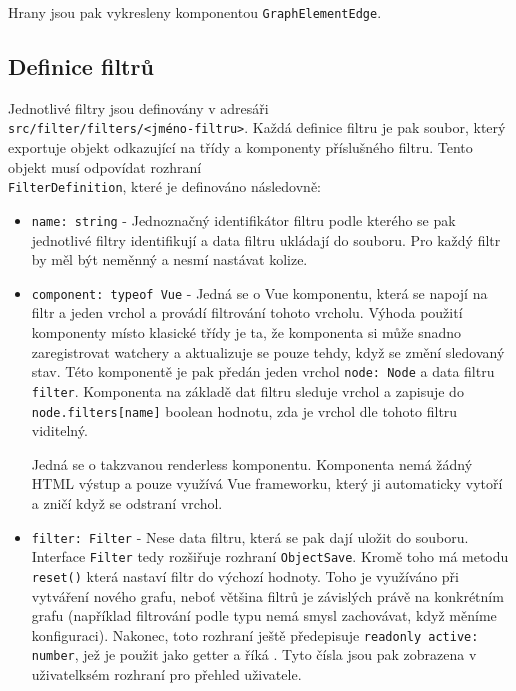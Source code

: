 \bigskip

Hrany jsou pak vykresleny komponentou \texttt{GraphElementEdge}.




\subsection{Definice filtrů}
Jednotlivé filtry jsou definovány v adresáři \\\texttt{src/filter/filters/<jméno-filtru>}. Každá definice filtru je pak soubor, který exportuje objekt odkazující na třídy a komponenty příslušného filtru. Tento objekt musí odpovídat rozhraní \\\texttt{FilterDefinition}, které je definováno následovně:

\begin{itemize}
  \item \texttt{name: string} - Jednoznačný identifikátor filtru podle kterého se pak jednotlivé filtry identifikují a data filtru ukládají do souboru. Pro každý filtr by měl být neměnný a nesmí nastávat kolize.
  \item \texttt{component: typeof Vue} - Jedná se o Vue komponentu, která se napojí na filtr a jeden vrchol a provádí filtrování tohoto vrcholu. Výhoda použití komponenty místo klasické třídy je ta, že komponenta si může snadno zaregistrovat watchery a aktualizuje se pouze tehdy, když se změní sledovaný stav. Této komponentě je pak předán jeden vrchol \texttt{node: Node} a data filtru \texttt{filter}. Komponenta na základě dat filtru sleduje vrchol a zapisuje do \texttt{node.filters[name]} boolean hodnotu, zda je vrchol dle tohoto filtru viditelný.

  Jedná se o takzvanou renderless komponentu. Komponenta nemá žádný HTML výstup a pouze využívá Vue frameworku, který ji automaticky vytoří a zničí když se odstraní vrchol.

  \item \texttt{filter: Filter} - Nese data filtru, která se pak dají uložit do souboru. Interface \texttt{Filter} tedy rozšiřuje rozhraní \texttt{ObjectSave}. Kromě toho má metodu \texttt{reset()} která nastaví filtr do výchozí hodnoty. Toho je využíváno při vytváření nového grafu, neboť většina filtrů je závislých právě na konkrétním grafu (například filtrování podle typu nemá smysl zachovávat, když měníme konfiguraci). Nakonec, toto rozhraní ještě předepisuje \texttt{readonly active: number}, jež je použit jako getter a říká . Tyto čísla jsou pak zobrazena v uživatelksém rozhraní pro přehled uživatele.


\end{itemize}
